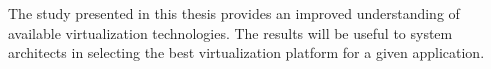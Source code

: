 The study presented in this thesis provides an improved understanding of available virtualization technologies. The results will be useful to  system architects in selecting the best virtualization platform for a given application.



